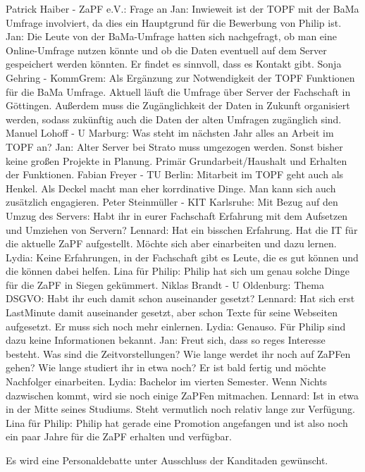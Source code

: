     \begin{outline}
      \1 Patrick Haiber - ZaPF e.V.:  Frage an Jan: Inwieweit ist der TOPF mit der BaMa Umfrage involviert, da dies ein Hauptgrund für die Bewerbung von Philip ist.
        \2 Jan: Die Leute von der BaMa-Umfrage hatten sich nachgefragt, ob man eine Online-Umfrage nutzen könnte und ob die Daten eventuell auf dem Server gespeichert werden könnten. Er findet es sinnvoll, dass es Kontakt gibt.
        \2 Sonja Gehring - KommGrem:  Als Ergänzung zur Notwendigkeit der TOPF Funktionen für die BaMa Umfrage. Aktuell läuft die Umfrage über Server der Fachschaft in Göttingen. Außerdem muss die Zugänglichkeit der Daten in Zukunft organisiert werden, sodass zukünftig auch die Daten der alten Umfragen zugänglich sind.
      \1 Manuel Lohoff - U Marburg:  Was steht im nächsten Jahr alles an Arbeit im TOPF an?
        \2 Jan: Alter Server bei Strato muss umgezogen werden. Sonst bisher keine großen Projekte in Planung. Primär Grundarbeit/Haus\-halt und Erhalten der Funktionen.
        \2 Fabian Freyer - TU Berlin:  Mitarbeit im TOPF geht auch als Henkel. Als Deckel macht man eher korrdinative Dinge. Man kann sich auch zusätzlich engagieren.
      \1 Peter Steinmüller - KIT Karlsruhe:  Mit Bezug auf den Umzug des Servers: Habt ihr in eurer Fachschaft Erfahrung mit dem Aufsetzen und Umziehen von Servern?
        \2 Lennard: Hat ein bisschen Erfahrung. Hat die IT für die aktuelle ZaPF aufgestellt. Möchte sich aber einarbeiten und dazu lernen.
        \2 Lydia: Keine Erfahrungen, in der Fachschaft gibt es Leute, die es gut können und die können dabei helfen.
        \2 Lina für Philip: Philip hat sich um genau solche Dinge für die ZaPF in Siegen gekümmert.
      \1 Niklas Brandt - U Oldenburg:  Thema DSGVO: Habt ihr euch damit schon auseinander gesetzt?
        \2 Lennard: Hat sich erst LastMinute damit auseinander gesetzt, aber schon Texte für seine Webseiten aufgesetzt. Er muss sich noch mehr einlernen.
        \2 Lydia: Genauso.
        \2 Für Philip sind dazu keine Informationen bekannt.
      \1 Jan: Freut sich, dass so reges Interesse besteht. Was sind die Zeitvorstellungen? Wie lange werdet ihr noch auf ZaPFen gehen? Wie lange studiert ihr in etwa noch? Er ist bald fertig und möchte Nachfolger einarbeiten.
        \2 Lydia: Bachelor im vierten Semester. Wenn Nichts dazwischen kommt, wird sie noch einige ZaPFen mitmachen.
        \2 Lennard: Ist in etwa in der Mitte seines Studiums. Steht vermutlich noch relativ lange zur Verfügung.
        \2 Lina für Philip: Philip hat gerade eine Promotion angefangen und ist also noch ein paar Jahre für die ZaPF erhalten und verfügbar.
    \end{outline}
    Es wird eine Personaldebatte unter Ausschluss der Kanditaden gewünscht.

